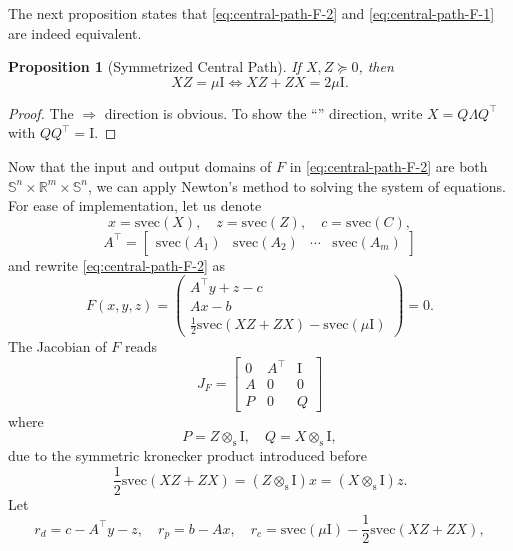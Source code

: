 \documentclass[
]{book}
\newtheorem{proposition}{Proposition}[chapter]
\theoremstyle{definition}
\theoremstyle{definition}
\theoremstyle{definition}
\theoremstyle{definition}
\theoremstyle{remark}
\begin{document}
The next proposition states that \eqref{eq:central-path-F-2} and \eqref{eq:central-path-F-1} are indeed equivalent.

\begin{proposition}[Symmetrized Central Path]
\protect\hypertarget{prp:SymmetricCentralPath}{}\label{prp:SymmetricCentralPath}If \(X,Z \succeq 0\), then
\[
XZ = \mu \mathrm{I}\Leftrightarrow XZ + ZX = 2 \mu \mathrm{I}.
\]
\end{proposition}

\begin{proof}
The \(\Rightarrow\) direction is obvious. To show the ``\Leftarrow'' direction, write \(X = Q \Lambda Q^\top\) with \(QQ^\top= \mathrm{I}\).
\end{proof}

Now that the input and output domains of \(F\) in \eqref{eq:central-path-F-2} are both \(\mathbb{S}^{n} \times \mathbb{R}^{m} \times \mathbb{S}^{n}\), we can apply Newton's method to solving the system of equations. For ease of implementation, let us denote
\[
x = \mathrm{svec}(X), \quad z = \mathrm{svec}(Z), \quad c = \mathrm{svec}(C), 
\]
\[
A^\top= \begin{bmatrix}
\mathrm{svec}(A_1) & \mathrm{svec}(A_2) & \cdots & \mathrm{svec}(A_m)
\end{bmatrix}
\]
and rewrite \eqref{eq:central-path-F-2} as
\begin{equation}
F(x,y,z) = \begin{pmatrix}
A^\top y + z - c \\
A x - b \\
\frac{1}{2}\mathrm{svec}(XZ + ZX) - \mathrm{svec}(\mu \mathrm{I})
\end{pmatrix} = 0.
\label{eq:central-path-F-3}
\end{equation}
The Jacobian of \(F\) reads
\begin{equation}
J_F = \begin{bmatrix}
0 & A^\top& \mathrm{I}\\
A & 0 & 0 \\
P & 0 & Q
\end{bmatrix}
\label{eq:aho-Jacobian}
\end{equation}
where
\[
P = Z \otimes_{\mathrm{s}}\mathrm{I}, \quad Q = X \otimes_{\mathrm{s}}\mathrm{I},
\]
due to the symmetric kronecker product introduced before
\[
\frac{1}{2}\mathrm{svec}(XZ + ZX) = (Z \otimes_{\mathrm{s}}\mathrm{I}) x = (X \otimes_{\mathrm{s}}\mathrm{I}) z.
\]
Let
\[
r_d = c - A^\top y - z, \quad r_p = b - Ax, \quad r_c = \mathrm{svec}(\mu \mathrm{I}) - \frac{1}{2}\mathrm{svec}(XZ + ZX),
\]
\end{document}
